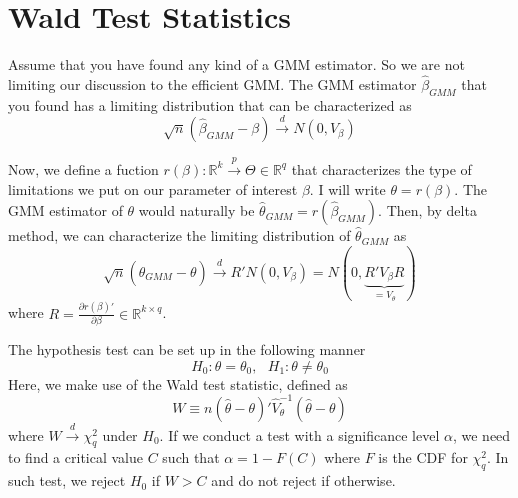 \section{Wald Test Statistics}
Assume that you have found any kind of a GMM estimator. So we are not limiting our discussion to the efficient GMM. The GMM estimator $\hat{\beta}_{GMM}$ that you found has a limiting distribution that can be characterized as
\[
\sqrt{n}(\hat{\beta}_{GMM}-\beta)\xrightarrow{d}N(0,V_\beta)
\]\par
Now, we define a fuction $r(\beta):\mathbb{R}^k\xrightarrow{p} \Theta\in\mathbb{R}^q$ that characterizes the type of limitations we put on our parameter of interest $\beta$. I will write $\theta=r(\beta)$. The GMM estimator of $\theta$ would naturally be $\hat{\theta}_{GMM}=r(\hat{\beta}_{GMM})$. Then, by delta method, we can characterize the limiting distribution of $\hat{\theta}_{GMM}$ as
\[
\sqrt{n}(\hat{\theta}_{GMM}-\theta)\xrightarrow{d}R'N(0,V_\beta) = N(0,\underbrace{R'V_\beta R}_{=V_\theta})
\]
where $R = \frac{\partial r(\beta)'}{\partial \beta}\in\mathbb{R}^{k\times q}$. \par
The hypothesis test can be set up in the following manner
\[
H_0 : \theta= \theta_0, \ \ \ H_1 : \theta \neq \theta_0
\]
Here, we make use of the Wald test statistic, defined as
\[
W\equiv n(\hat{\theta}-\theta)'\widehat{V}_{\theta}^{-1} (\hat{\theta}-\theta)
\]
where $W\xrightarrow{d}\chi_q^2$ under $H_0$. If we conduct a test with a significance level $\alpha$, we need to find a critical value $C$ such that $\alpha=1-F(C)$ where $F$ is the CDF for $\chi^2_{q}$. In such test, we reject $H_0$ if $W>C$ and do not reject if otherwise. \par

